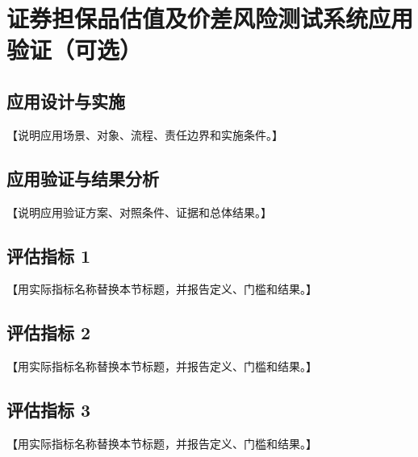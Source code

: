 \chapter{证券担保品估值及价差风险测试系统应用验证（可选）}

\section{应用设计与实施}

【说明应用场景、对象、流程、责任边界和实施条件。】

\section{应用验证与结果分析}

【说明应用验证方案、对照条件、证据和总体结果。】

\section{评估指标 1}

【用实际指标名称替换本节标题，并报告定义、门槛和结果。】

\section{评估指标 2}

【用实际指标名称替换本节标题，并报告定义、门槛和结果。】

\section{评估指标 3}

【用实际指标名称替换本节标题，并报告定义、门槛和结果。】
